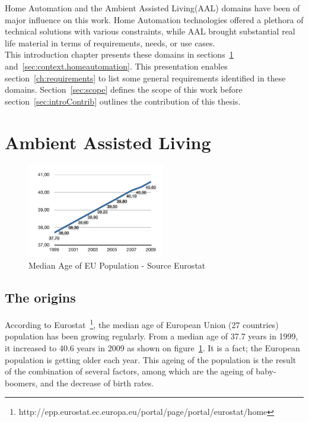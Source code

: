 Home Automation and the Ambient Assisted Living(AAL) domains have been of major influence on this work. Home Automation technologies offered a plethora of technical solutions with various constraints, while AAL brought substantial real life material in terms of requirements, needs, or use cases.\\
This introduction chapter presents these domains in sections~\ref{sec:context.aal} and~\ref{sec:context.homeautomation}. This presentation enables section~\ref{ch:requirements} to list some general requirements identified in these domains. Section~\ref{sec:scope} defines the scope of this work before section~\ref{sec:introContrib} outlines the contribution of this thesis.


\section{Ambient Assisted Living}
\label{sec:context.aal}

\begin{figure}
	\vspace{-0.5cm}
  \centering
  \includegraphics[width=60mm]{part1/pics/medianAgeEUPop.pdf}
  \caption{Median Age of EU Population - Source Eurostat}
    \label{fig:medAge}
	\vspace{-0.5cm}
\end{figure}

\subsection{The origins}

According to Eurostat~\footnote{http://epp.eurostat.ec.europa.eu/portal/page/portal/eurostat/home}, the median age of European Union (27 countries) population has been growing regularly. From a median age of 37.7 years in 1999, it increased to 40.6 years in 2009 as shown on figure~\ref{fig:medAge}. It is a fact; the European population is getting older each year. This ageing of the population is the result of the combination of several factors, among which are the ageing of baby-boomers, and the decrease of birth rates.\\

